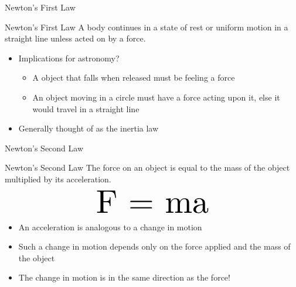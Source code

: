 \documentclass[pdf, aspectratio=169]{beamer}
\begin{document}
\begin{frame}{Newton's First Law}
  \begin{alertblock}{Newton's First Law}
	A body continues in a state of rest or uniform motion in a straight line unless acted on by a force.
  \end{alertblock}
  \begin{itemize}
	\item Implications for astronomy?
	  \begin{itemize}
		\item A object that falls when released must be feeling a force
		\item An object moving in a circle must have a force acting upon it, else it would travel in a straight line
	  \end{itemize}
	\item Generally thought of as the inertia law
  \end{itemize}
\end{frame}

\begin{frame}{Newton's Second Law}
  \begin{alertblock}{Newton's Second Law}
	The force on an object is equal to the mass of the object multiplied by its acceleration.
	\[\scalebox{4}{F = ma}\]
  \end{alertblock}
  \begin{itemize}
	\item An acceleration is analogous to a change in motion
	\item Such a change in motion depends only on the force applied and the mass of the object
	\item \alert{The change in motion is in the same direction as the force!}
  \end{itemize}
\end{frame}
\end{document}

